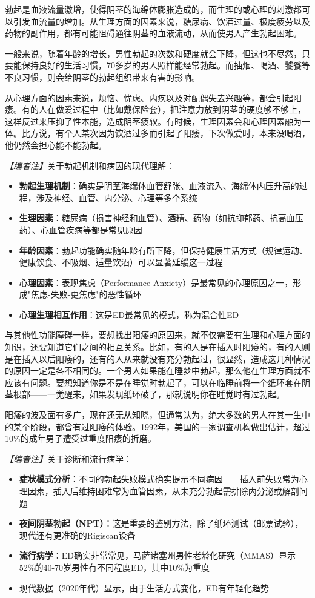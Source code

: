 勃起是血液流量激增，使得阴茎的海绵体膨胀造成的，而生理的或心理的刺激都可以引发血流量的增加。从生理方面的因素来说，糖尿病、饮酒过量、极度疲劳以及药物的副作用，都有可能阻碍通往阴茎的血液流动，从而使男人产生勃起困难。

一般来说，随着年龄的增长，男性勃起的次数和硬度就会下降，但这也不尽然，只要能保持良好的生活习惯，70多岁的男人照样能经常勃起。而抽烟、喝酒、饕餮等不良习惯，则会给阴茎的勃起组织带来有害的影响。

从心理方面的因素来说，烦恼、忧虑、内疚以及对配偶失去兴趣等，都会引起阳痿。有的人在做爱过程中（比如戴保险套），把注意力放到阴茎的硬度够不够上，这样反过来压抑了性本能，造成阴茎疲软。有时候，生理因素会和心理因素融为一体。比方说，有个人某次因为饮酒过多而引起了阳痿，下次做爱时，本来没喝酒，他仍然会担心能不能勃起。

\noindent\textit{【编者注】}关于勃起机制和病因的现代理解：
\begin{itemize}
	\item \textbf{勃起生理机制}：确实是阴茎海绵体血管舒张、血液流入、海绵体内压升高的过程，涉及神经、血管、内分泌、心理等多个系统
	\item \textbf{生理因素}：糖尿病（损害神经和血管）、酒精、药物（如抗抑郁药、抗高血压药）、心血管疾病等都是常见原因
	\item \textbf{年龄因素}：勃起功能确实随年龄有所下降，但保持健康生活方式（规律运动、健康饮食、不吸烟、适量饮酒）可以显著延缓这一过程
	\item \textbf{心理因素}：表现焦虑（Performance Anxiety）是最常见的心理原因之一，形成"焦虑-失败-更焦虑"的恶性循环
	\item \textbf{心理生理相互作用}：这是ED最常见的模式，称为混合性ED
\end{itemize}

与其他性功能障碍一样，要想找出阳痿的原因来，就不仅需要有生理和心理方面的知识，还要知道它们之间的相互关系。比如，有的人是在插入时阳痿的，有的人则是在插入以后阳痿的，还有的人从来就没有充分勃起过，很显然，造成这几种情况的原因一定是各不相同的。一个男人如果能在睡梦中勃起，那么他在生理方面就不应该有问题。要想知道你是不是在睡觉时勃起了，可以在临睡前将一个纸环套在阴茎根部——一觉醒来，如果发现纸环破了，那就说明你在睡觉时有过勃起。

阳痿的波及面有多广，现在还无从知晓，但通常认为，绝大多数的男人在其一生中的某个阶段，都曾有过阳痿的体验。1992年，美国的一家调查机构做出估计，超过10\%的成年男子遭受过重度阳痿的折磨。

\noindent\textit{【编者注】}关于诊断和流行病学：
\begin{itemize}
	\item \textbf{症状模式分析}：不同的勃起失败模式确实提示不同病因——插入前失败常为心理因素，插入后维持困难常为血管因素，从未充分勃起需排除内分泌或解剖问题
	\item \textbf{夜间阴茎勃起（NPT）}：这是重要的鉴别方法，除了纸环测试（邮票试验），现代还有更准确的Rigiscan设备
	\item \textbf{流行病学}：ED确实非常常见，马萨诸塞州男性老龄化研究（MMAS）显示52\%的40-70岁男性有不同程度ED，其中10\%为重度
	\item 现代数据（2020年代）显示，由于生活方式变化，ED有年轻化趋势
\end{itemize}

